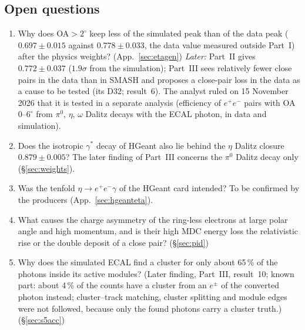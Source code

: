 \documentclass[11pt,a4paper]{article}
\newcommand{\piz}{\ensuremath{\pi^{0}}\xspace}
\newcommand{\ee}{\ensuremath{e^{+}e^{-}}\xspace}
\begin{document}
\subsection{Open questions}
\label{sec:resopen}
\begin{enumerate}\setlength{\itemsep}{1pt}
\item Why does OA$>2^\circ$ keep less of the simulated peak than of the data peak ($0.697\pm0.015$ against
      $0.778\pm0.033$, the data value measured outside Part~I) after the physics weights? (App.~\ref{sec:etagen})
      \emph{Later:} Part~II gives $0.772\pm0.037$ ($1.9\sigma$ from the simulation); Part~III sees relatively fewer close
      pairs in the data than in SMASH and proposes a close-pair loss in the data as a cause to be tested (its D32; result~6).
      The analyst ruled on 15 November 2026 that it is tested in a separate analysis (efficiency of \ee pairs with OA
      0--$6^\circ$ from \piz, $\eta$, $\omega$ Dalitz decays with the ECAL photon, in data and simulation).
\item Does the isotropic $\gamma^*$ decay of HGeant also lie behind the $\eta$ Dalitz closure $0.879\pm0.005$? The later
      finding of Part~III concerns the \piz Dalitz decay only (\S\ref{sec:weights}).
\item Was the tenfold $\eta\to\ee\gamma$ of the HGeant card intended? To be confirmed by the producers
      (App.~\ref{sec:hgeanteta}).
\item What causes the charge asymmetry of the ring-less electrons at large polar angle and high momentum, and is their
      high MDC energy loss the relativistic rise or the double deposit of a close pair? (\S\ref{sec:pid})
\item Why does the simulated ECAL find a cluster for only about 65\,\% of the photons inside its active modules?
      (Later finding, Part~III, result~10; known part: about 4\,\% of the counts have a cluster from an $e^\pm$ of the
      converted photon instead; cluster--track matching, cluster splitting and module edges were not followed, because only
      the found photons carry a cluster truth.) (\S\ref{sec:s5acc})
\end{enumerate}
\end{document}
